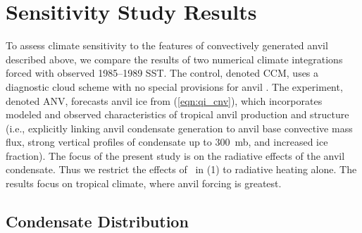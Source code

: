 \documentclass[twoside,agupp]{aguplus}
\begin{document}
\section{Sensitivity Study Results}\label{sec:ss}

To assess climate sensitivity to the features of convectively
generated anvil described above, we compare the results of two
numerical climate integrations forced with observed 1985--1989 SST.  
The control, denoted CCM, uses a diagnostic cloud scheme with no
special provisions for anvil \cite[]{KBB96}.
The experiment, denoted ANV, forecasts anvil ice from
(\ref{eqn:qi_cnv}), which incorporates modeled and observed 
characteristics of tropical anvil production and structure (i.e.,
explicitly linking anvil condensate generation to anvil base
convective mass flux, strong vertical profiles of condensate up to
300~mb, and increased ice fraction).
The focus of the present study is on the radiative effects of the
anvil condensate. 
Thus we restrict the effects of \qi\ in (1) to radiative heating
alone. 
The results focus on tropical climate, where anvil forcing is
greatest.   



\subsection{Condensate Distribution}\label{sec:qc}
\end{document}
